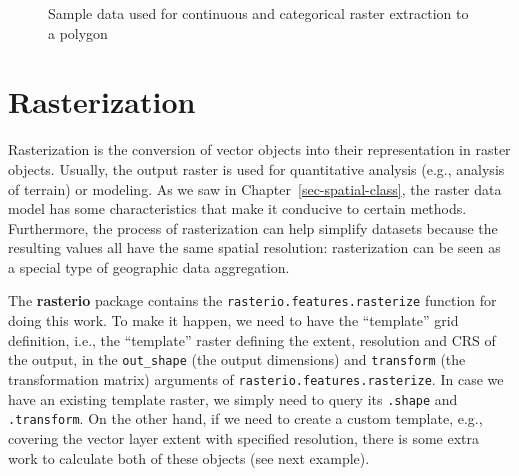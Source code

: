 \documentclass[
  letterpaper,
]{krantz}
\begin{document}
\begin{figure}

\begin{minipage}{0.50\linewidth}



\end{minipage}%
%
\begin{minipage}{0.50\linewidth}



\end{minipage}%

\caption{\label{fig-raster-extract-to-polygon}Sample data used for
continuous and categorical raster extraction to a polygon}

\end{figure}%

\section{Rasterization}\label{sec-rasterization}

Rasterization is the conversion of vector objects into their
representation in raster objects. Usually, the output raster is used for
quantitative analysis (e.g., analysis of terrain) or modeling. As we saw
in Chapter~\ref{sec-spatial-class}, the raster data model has some
characteristics that make it conducive to certain methods. Furthermore,
the process of rasterization can help simplify datasets because the
resulting values all have the same spatial resolution: rasterization can
be seen as a special type of geographic data aggregation.

The \textbf{rasterio} package contains the
\texttt{rasterio.features.rasterize} function for doing this work. To
make it happen, we need to have the ``template'' grid definition, i.e.,
the ``template'' raster defining the extent, resolution and CRS of the
output, in the \texttt{out\_shape} (the output dimensions) and
\texttt{transform} (the transformation matrix) arguments of
\texttt{rasterio.features.rasterize}. In case we have an existing
template raster, we simply need to query its \texttt{.shape} and
\texttt{.transform}. On the other hand, if we need to create a custom
template, e.g., covering the vector layer extent with specified
resolution, there is some extra work to calculate both of these objects
(see next example).
\end{document}
